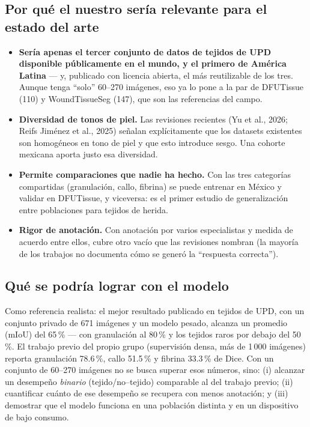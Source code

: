 \documentclass[12pt,letterpaper]{article}
\begin{document}
\subsection{Por qué el nuestro sería relevante para el estado del arte}

\begin{itemize}
  \item \textbf{Sería apenas el tercer conjunto de datos de tejidos de UPD disponible públicamente en
        el mundo, y el primero de América Latina} --- y, publicado con licencia abierta, el más
        reutilizable de los tres. Aunque tenga ``solo'' 60--270 imágenes, eso ya lo pone a la par de
        DFUTissue (110) y WoundTissueSeg (147), que son las referencias del campo.
  \item \textbf{Diversidad de tonos de piel.} Las revisiones recientes (Yu et al., 2026;
        Reifs Jiménez et al., 2025) señalan explícitamente que los datasets existentes son
        homogéneos en tono de piel y que esto introduce sesgo. Una cohorte mexicana aporta justo esa
        diversidad.
  \item \textbf{Permite comparaciones que nadie ha hecho.} Con las tres categorías compartidas
        (granulación, callo, fibrina) se puede entrenar en México y validar en DFUTissue, y
        viceversa: es el primer estudio de generalización entre poblaciones para tejidos de herida.
  \item \textbf{Rigor de anotación.} Con anotación por varios especialistas y medida de acuerdo
        entre ellos, cubre otro vacío que las revisiones nombran (la mayoría de los trabajos no
        documenta cómo se generó la ``respuesta correcta'').
\end{itemize}

\subsection{Qué se podría lograr con el modelo}

Como referencia realista: el mejor resultado publicado en tejidos de UPD, con un conjunto privado de
671 imágenes y un modelo pesado, alcanza un promedio (mIoU) del 65\,\% --- con granulación al 80\,\%
y los tejidos raros por debajo del 50\,\%. El trabajo previo del propio grupo (supervisión densa,
más de 1\,000 imágenes) reporta granulación 78.6\,\%, callo 51.5\,\% y fibrina 33.3\,\% de Dice. Con
un conjunto de 60--270 imágenes no se busca superar esos números, sino: (i) alcanzar un desempeño
\emph{binario} (tejido/no--tejido) comparable al del trabajo previo; (ii) cuantificar cuánto de ese
desempeño se recupera con menos anotación; y (iii) demostrar que el modelo funciona en una población
distinta y en un dispositivo de bajo consumo.
\end{document}
